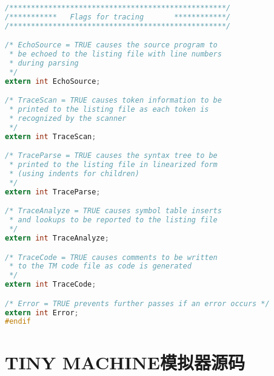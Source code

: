 \documentclass[lang=cn,10pt]{elegantbook}
\begin{document}
\begin{lstlisting}[caption={globals.h},language=c]
/**************************************************/
/***********   Flags for tracing       ************/
/**************************************************/

/* EchoSource = TRUE causes the source program to
 * be echoed to the listing file with line numbers
 * during parsing
 */
extern int EchoSource;

/* TraceScan = TRUE causes token information to be
 * printed to the listing file as each token is
 * recognized by the scanner
 */
extern int TraceScan;

/* TraceParse = TRUE causes the syntax tree to be
 * printed to the listing file in linearized form
 * (using indents for children)
 */
extern int TraceParse;

/* TraceAnalyze = TRUE causes symbol table inserts
 * and lookups to be reported to the listing file
 */
extern int TraceAnalyze;

/* TraceCode = TRUE causes comments to be written
 * to the TM code file as code is generated
 */
extern int TraceCode;

/* Error = TRUE prevents further passes if an error occurs */
extern int Error; 
#endif
\end{lstlisting}

\chapter{TINY MACHINE模拟器源码}
\label{append:C}
\end{document}
